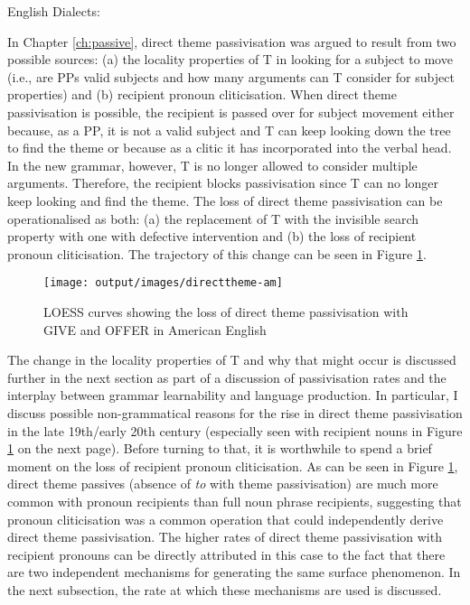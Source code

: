 \begin{exe}
	 English Dialects:
		\begin{xlist}
		\end{xlist}
\end{exe}
	
	In Chapter \ref{ch:passive}, direct theme passivisation was argued to result from two possible sources: (a) the locality properties of T in looking for a subject to move (i.e., are PPs valid subjects and how many arguments can T consider for subject properties) and (b) recipient pronoun cliticisation. When direct theme passivisation is possible, the recipient is passed over for subject movement either because, as a PP, it is not a valid subject and T can keep looking down the tree to find the theme or because as a clitic it has incorporated into the verbal head. In the new grammar, however, T is no longer allowed to consider multiple arguments. Therefore, the recipient blocks passivisation since T can no longer keep looking and find the theme. The loss of direct theme passivisation can be operationalised as both: (a) the replacement of T with the invisible search property with one with defective intervention and (b) the loss of recipient pronoun cliticisation. The trajectory of this change can be seen in Figure \ref{fig:loss-of-dt-in-amen}.

	\begin{figure}[ht!]
		\texttt{[image: output/images/directtheme-am]}
		\caption{LOESS curves showing the loss of direct theme passivisation with GIVE and OFFER in American English}
		\label{fig:loss-of-dt-in-amen}
	\end{figure}

	The change in the locality properties of T and why that might occur is discussed further in the next section as part of a discussion of passivisation rates and the interplay between grammar learnability and language production. In particular, I discuss possible non-grammatical reasons for the rise in direct theme passivisation in the late 19th/early 20th century (especially seen with recipient nouns in Figure \ref{fig:loss-of-dt-in-amen} on the next page). Before turning to that, it is worthwhile to spend a brief moment on the loss of recipient pronoun cliticisation. As can be seen in Figure \ref{fig:loss-of-dt-in-amen}, direct theme passives (absence of \textit{to} with theme passivisation) are much more common with pronoun recipients than full noun phrase recipients, suggesting that pronoun cliticisation was a common operation that could independently derive direct theme passivisation. The higher rates of direct theme passivisation with recipient pronouns can be directly attributed in this case to the fact that there are two independent mechanisms for generating the same surface phenomenon. In the next subsection, the rate at which these mechanisms are used is discussed.
	
